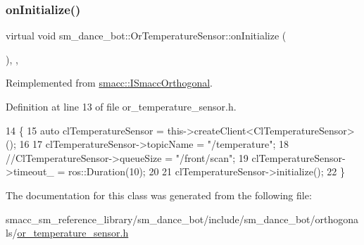 \subsubsection{\texorpdfstring{on\+Initialize()}{onInitialize()}}
{\footnotesize\ttfamily virtual void sm\+\_\+dance\+\_\+bot\+::\+Or\+Temperature\+Sensor\+::on\+Initialize (\begin{DoxyParamCaption}{ }\end{DoxyParamCaption})\hspace{0.3cm}{\ttfamily [inline]}, {\ttfamily [override]}, {\ttfamily [virtual]}}



Reimplemented from \hyperlink{classsmacc_1_1ISmaccOrthogonal_a6bb31c620cb64dd7b8417f8705c79c7a}{smacc\+::\+I\+Smacc\+Orthogonal}.



Definition at line 13 of file or\+\_\+temperature\+\_\+sensor.\+h.


\begin{DoxyCode}
14     \{
15         \textcolor{keyword}{auto} clTemperatureSensor = this->createClient<ClTemperatureSensor>();
16 
17         clTemperatureSensor->topicName = \textcolor{stringliteral}{"/temperature"};
18         \textcolor{comment}{//ClTemperatureSensor->queueSize = "/front/scan";}
19         clTemperatureSensor->timeout\_ = ros::Duration(10);
20 
21         clTemperatureSensor->initialize();
22     \}
\end{DoxyCode}


The documentation for this class was generated from the following file\+:\begin{DoxyCompactItemize}
\item 
smacc\+\_\+sm\+\_\+reference\+\_\+library/sm\+\_\+dance\+\_\+bot/include/sm\+\_\+dance\+\_\+bot/orthogonals/\hyperlink{sm__dance__bot_2include_2sm__dance__bot_2orthogonals_2or__temperature__sensor_8h}{or\+\_\+temperature\+\_\+sensor.\+h}\end{DoxyCompactItemize}
